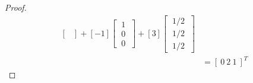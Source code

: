 \documentclass[../main.tex]{subfiles}
\begin{document}
\begin{proof}
\begin{align*}
\begin{bmatrix}
                \end{bmatrix} +
                [-1] \begin{bmatrix}
                        \ 1 \ \\
                        \ 0 \ \\
                        \ 0 \
                \end{bmatrix} +
                [3]\begin{bmatrix}
                        \ {1}/{2} \ \\
                        \ {1}/{2} \ \\
                        \ {1}/{2} \
                \end{bmatrix}                     \\
                 & = [\ 0 \ 2 \ 1\ ]^T
        \end{align*}
\end{proof}
\pagebreak
\end{document}
